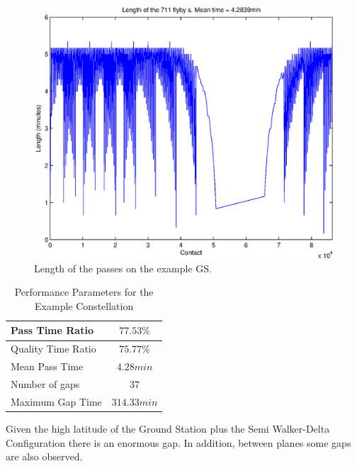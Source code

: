 \begin{figure}[H]
\begin{center}
\includegraphics[scale=0.8]{LengthPass}
\caption{Length of the passes on the example GS.}
\end{center}
\end{figure}

\begin{table}[H]
\centering

\begin{tabular}{|l|c|}
\hline
Pass Time Ratio & $77.53\% $ \\ \hline
Quality Time Ratio     & $ 75.77\% $   \\ \hline
Mean Pass Time   & $ 4.28 min $ \\ \hline
Number of gaps  	 & $37$   \\ \hline
Maximum Gap Time   & $ 314.33 min $   \\ \hline
\end{tabular}
\caption{Performance Parameters for the Example Constellation}
\end{table}

Given the high latitude of the Ground Station plus the Semi Walker-Delta Configuration there is an enormous gap. In addition, between planes some gaps are also observed.